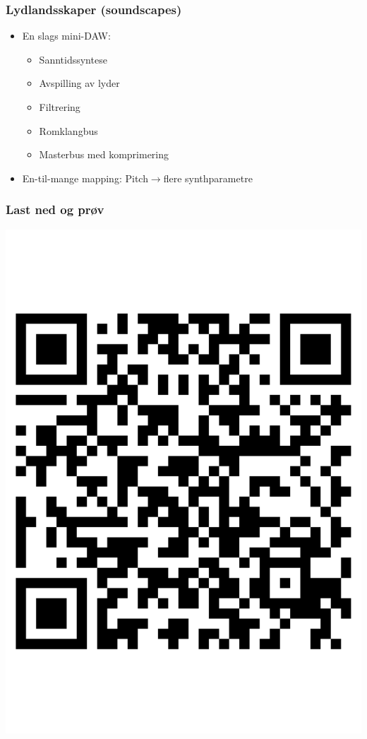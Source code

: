 \documentclass{beamer}
\begin{document}
\begin{frame}
	\frametitle{Lydlandsskaper (soundscapes)}
	\begin{itemize}[<+->]
		\item En slags mini-DAW:
			\begin{itemize}
				\item Sanntidssyntese
				\item Avspilling av lyder
				\item Filtrering
				\item Romklangbus
				\item Masterbus med komprimering
			\end{itemize}
		\item En-til-mange mapping: Pitch$\rightarrow$flere synthparametre
	\end{itemize}
\end{frame}




\begin{frame}
	\frametitle{Last ned og prøv}
	\centering
	\includegraphics[scale=.3]{pics/document.pdf}
\end{frame}

\begin{frame}[allowframebreaks]



\end{frame}
\end{document}
